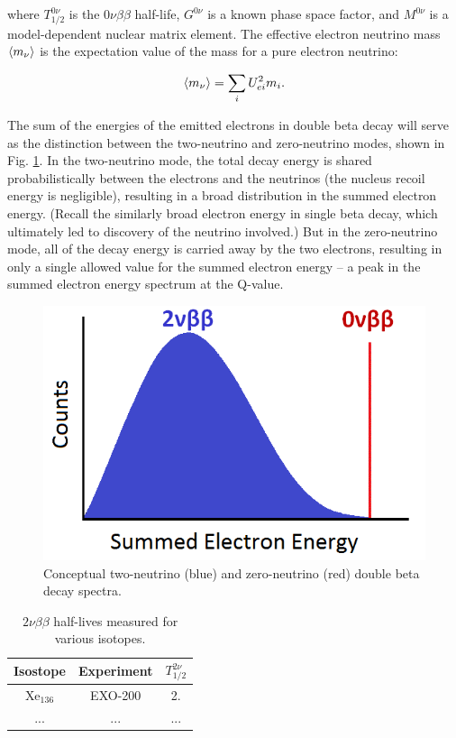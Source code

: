 \noindent
where $T_{1/2}^{0\nu}$ is the $0\nu\beta\beta$ half-life,  $G^{0\nu}$ is a known phase space factor, and $M^{0\nu}$ is a model-dependent nuclear matrix element. The effective electron neutrino mass $\braket{m_{\nu}}$ is the expectation value of the mass for a pure electron neutrino:

\begin{equation}
\braket{m_{\nu}} = \sum\limits_{i} U_{ei}^{2} m_{i}.
\label{eqn:effectivemass}
\end{equation}

The sum of the energies of the emitted electrons in double beta decay will serve as the distinction between the two-neutrino and zero-neutrino modes, shown in Fig. \ref{fig:spectrum_bb}. In the two-neutrino mode, the total decay energy is shared probabilistically between the electrons and the neutrinos (the nucleus recoil energy is negligible), resulting in a broad distribution in the summed electron energy. (Recall the similarly broad electron energy in single beta decay, which ultimately led to discovery of the neutrino involved.) But in the zero-neutrino mode, all of the decay energy is carried away by the two electrons, resulting in only a single allowed value for the summed electron energy -- a peak in the summed electron energy spectrum at the Q-value. 

\begin{figure}[H]
        \centering
                \includegraphics[width=.7\textwidth]{figures/spectrum_bb.png}
                \caption{Conceptual two-neutrino (blue) and zero-neutrino (red) double beta decay spectra.}
\label{fig:spectrum_bb}
\end{figure}

\begin{table}[!htbp]
\caption{$2\nu\beta\beta$ half-lives measured for various isotopes.} %
\label{table:bb_isotopes}
\begin{tabular}{c|c|c}
Isostope & Experiment & $T^{2\nu}_{1/2}$\\
\hline
Xe$_{136}$ & EXO-200 & 2.\\
... & ... & ...\\
\end{tabular}
\end{table}

